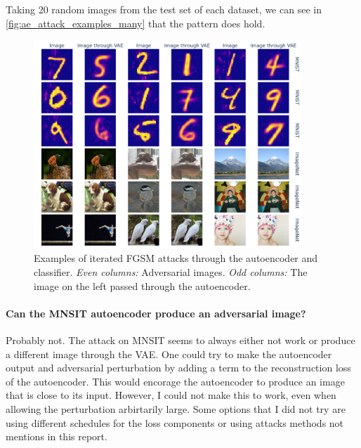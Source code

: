 \documentclass[]{scrarticle}
\renewcommand{\todo}[1]{}
\begin{document}
Taking 20 random images from the test set of each dataset,
we can see in \autoref{fig:ae_attack_examples_many} that the pattern
does hold.

\begin{figure}[h]
  \centering
  \includegraphics[width=0.9\textwidth]{images/ae_many_attack_examples.png}
  \caption{
    Examples of iterated FGSM attacks through the autoencoder and classifier.
    \emph{Even columns:} Adversarial images.
    \emph{Odd columns:} The image on the left passed through the autoencoder.
  }
  \label{fig:ae_attack_examples_many}
\end{figure}

\paragraph{Can the MNSIT autoencoder produce an adversarial image?}
Probably not.
The attack on MNSIT seems to always either not work or produce
a different image through the VAE. One could try to make the autoencoder
output and adversarial perturbation by adding a term to the reconstruction
loss of the autoencoder. This would encorage the autoencoder to produce
an image that is close to its input.
However, I could not make this to work, even when allowing the perturbation
arbirtarily large. Some options that I did not try are using different schedules for
the loss components or using attacks methods not mentions in this report.
\end{document}
